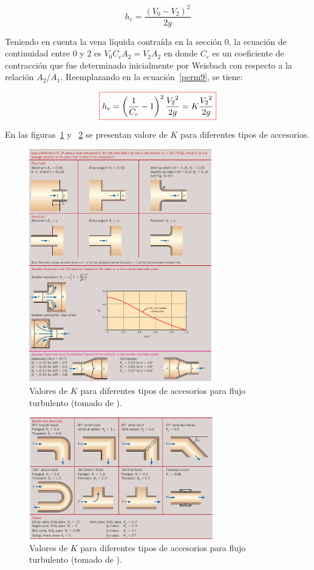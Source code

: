 \documentclass[11pt, oneside]{article}
\begin{document}
\begin{equation}
h_e = \frac{(V_0 - V_2)^2}{2g} 
\label{perm9}
\end{equation}

Teniendo en cuenta la vena l\'iquida contra\'ida en la secci\'on 0, la ecuaci\'on de continuidad entre 0 y 2 es $V_0 C_c A_2 = V_2 A_2$ en donde $C_c$ es un coeficiente de contracci\'on que fue determinado inicialmente por Weisbach con respecto a la relaci\'on $A_2 /A_1$. Reemplazando en la ecuaci\'on~\ref{perm9}, se tiene:

\begin{equation}
\color{red}\boxed{\color{black} h_e = \left( \frac{1}{C_c} -1 \right)^2 \frac{{V_2}^2}{2g} = K  \frac{{V_2}^2}{2g} }
\label{perm10}
\end{equation}

En las figuras~\ref{acce3} y ~\ref{acce4} se presentan valore de $K$ para diferentes tipos de accesorios. 

\begin{figure}[h]
\centering
\includegraphics[width=8cm]{acce3.png}
\caption{Valores de $K$ para diferentes tipos de accesorios para flujo turbulento (tomado de \cite{cengel2013ebook}).}
\label{acce3}
\end{figure}

\begin{figure}[h]
\centering
\includegraphics[width=8cm]{acce4.png}
\caption{Valores de $K$ para diferentes tipos de accesorios para flujo turbulento (tomado de \cite{cengel2013ebook}).}
\label{acce4}
\end{figure}
\end{document}
